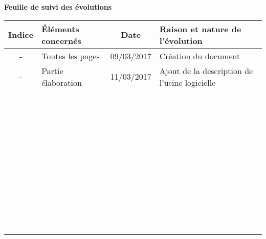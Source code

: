 \begin{center}\bfseries\Huge
    Feuille de suivi des évolutions
\end{center}
\begin{tabular}{|c|p{3.5cm}|c|p{9cm}|}
  \hline
  Indice & Éléments concernés & Date & Raison et nature de l'évolution \\ \hline
  - & Toutes les pages & 09/03/2017 & Création du document\\
  - & Partie élaboration & 11/03/2017 & Ajout de la description de l'usine logicielle\\
  &&&\\
  &&&\\
  &&&\\
  &&&\\
  &&&\\
  &&&\\
  &&&\\
  &&&\\
  &&&\\
  &&&\\
  &&&\\
  &&&\\
  &&&\\
  &&&\\
  &&&\\
  &&&\\
  &&&\\
  &&&\\
  &&&\\
  &&&\\
  &&&\\
  &&&\\
  &&&\\
  &&&\\
  &&&\\
  &&&\\
  &&&\\
  &&&\\
  &&&\\
  &&&\\
  &&&\\
  &&&\\
  &&&\\
  &&&\\
  &&&\\
  &&&\\
  &&&\\
  &&&\\
  &&&\\
  &&&\\
  &&&\\
  &&&\\
  &&&\\
  &&&\\
  &&&\\
  &&&\\
  &&&\\ \hline
\end{tabular}
